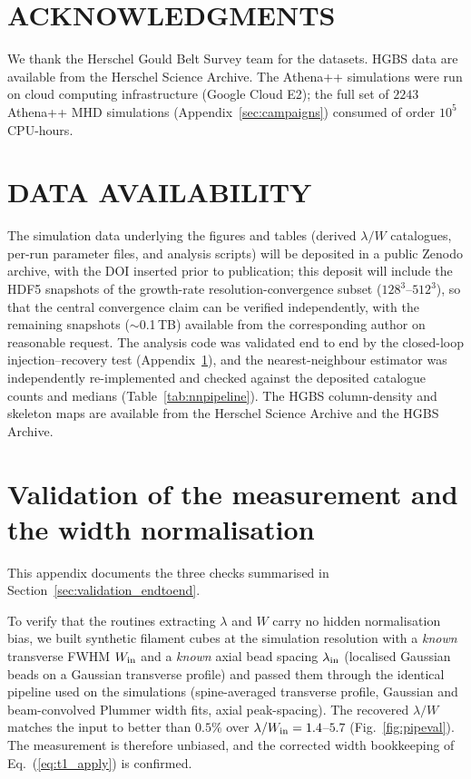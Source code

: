 \documentclass[usenatbib,twoside,twocolumn]{mnras}
\begin{document}
\section*{ACKNOWLEDGMENTS}

We thank the Herschel Gould Belt Survey team for the datasets. HGBS data are available from the Herschel Science Archive. The Athena++ simulations were run on cloud computing infrastructure (Google Cloud E2); the full set of $2243$ Athena++ MHD simulations (Appendix~\ref{sec:campaigns}) consumed of order $10^5$ CPU-hours.

\section*{DATA AVAILABILITY}

The simulation data underlying the figures and tables (derived $\lambda/W$ catalogues, per-run parameter files, and analysis scripts) will be deposited in a public Zenodo archive, with the DOI inserted prior to publication; this deposit will include the HDF5 snapshots of the growth-rate resolution-convergence subset ($128^3$--$512^3$), so that the central convergence claim can be verified independently, with the remaining snapshots ($\sim$0.1\,TB) available from the corresponding author on reasonable request. The analysis code was validated end to end by the closed-loop injection--recovery test (Appendix~\ref{sec:val_appendix}), and the nearest-neighbour estimator was independently re-implemented and checked against the deposited catalogue counts and medians (Table~\ref{tab:nnpipeline}). The HGBS column-density and skeleton maps are available from the Herschel Science Archive and the HGBS Archive.


\appendix

\section{Validation of the measurement and the width normalisation}
\label{sec:val_appendix}

This appendix documents the three checks summarised in Section~\ref{sec:validation_endtoend}.

To verify that the routines extracting $\lambda$ and $W$ carry no hidden normalisation bias, we built synthetic filament cubes at the simulation resolution with a \emph{known} transverse FWHM $W_{\rm in}$ and a \emph{known} axial bead spacing $\lambda_{\rm in}$ (localised Gaussian beads on a Gaussian transverse profile) and passed them through the identical pipeline used on the simulations (spine-averaged transverse profile, Gaussian and beam-convolved Plummer width fits, axial peak-spacing). The recovered $\lambda/W$ matches the input to better than $0.5\%$ over $\lambda/W_{\rm in}=1.4$--$5.7$ (Fig.~\ref{fig:pipeval}). The measurement is therefore unbiased, and the corrected width bookkeeping of Eq.~(\ref{eq:t1_apply}) is confirmed.
\end{document}
